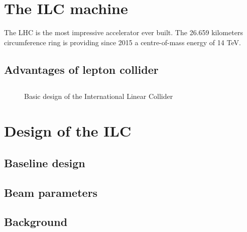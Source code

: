 



  
  
   
  \section{The ILC machine}
  
  The LHC is the most impressive accelerator ever built.
  The 26.659 kilometers circumference ring is providing since 2015 a centre-of-mass energy of 14 TeV.
   
    \subsection{Advantages of lepton collider}
    \subsection{}
  

  \begin{figure}
    \centering
    \caption{Basic design of the International Linear Collider}
    \label{fig:ILC}
  \end{figure}
  \section{Design of the ILC}
    \subsection{Baseline design}
    \subsection{Beam parameters}
    \subsection{Background}

